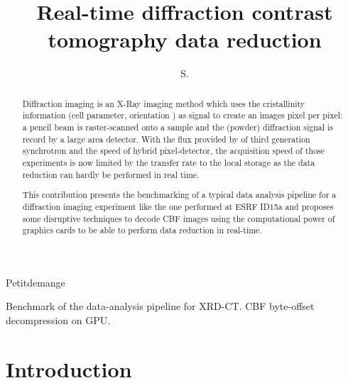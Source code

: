 \documentclass[preprint]{iucr}              %
\begin{document}

\title{Real-time diffraction contrast tomography data reduction}

 \author[a]{S.}{Petitdemange}
 





\maketitle                        %

\begin{synopsis}
Benchmark of the data-analysis pipeline for XRD-CT. CBF byte-offset
decompression on GPU.
\end{synopsis}

\begin{abstract}

Diffraction imaging is an X-Ray imaging method which uses the cristallinity
information (cell parameter, orientation ) as signal to create an images pixel
per pixel:
a pencil beam is raster-scanned onto a sample and the (powder) diffraction
signal is record by a large area detector. 
With the flux provided by of third generation synchrotron and the speed of
hybrid pixel-detector, the acquisition speed of those experiments is now 
limited by the transfer rate to the local storage as the data reduction can
hardly be performed in real time.

This contribution presents the benchmarking of a typical data
analysis pipeline for a diffraction imaging experiment like the one performed at
ESRF ID15a and proposes some disruptive techniques to decode CBF images using the
computational power of graphics cards to be able to perform data reduction in
real-time.
\end{abstract}


\section{Introduction}
\end{document}
